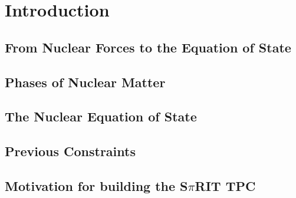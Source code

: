 \chapter{Introduction}
\section{From Nuclear Forces to the Equation of State}
\section{Phases of Nuclear Matter}
\section{The Nuclear Equation of State}
\section{Previous Constraints}
\section{Motivation for building the S$\pi$RIT TPC}